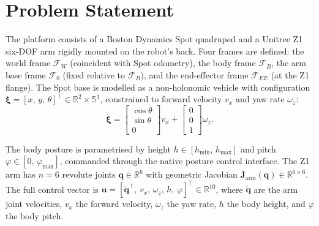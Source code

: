 \section{Problem Statement}
\label{sec:problem_formulation}

The  platform consists of a Boston Dynamics Spot quadruped and a
Unitree Z1 six-\ac{DOF} arm rigidly mounted on the robot's back. Four frames
are defined: the world frame $\mathcal{F}_W$ (coincident with Spot odometry),
the body frame $\mathcal{F}_B$, the arm base frame $\mathcal{F}_0$ (fixed
relative to $\mathcal{F}_B$), and the end-effector frame $\mathcal{F}_{EE}$ (at
the Z1 flange).  The Spot base is
modelled as a non-holonomic vehicle with
configuration $\boldsymbol{\xi} = [x,\, y,\, \theta]^\top \in \mathbb{R}^2
\times \mathbb{S}^1$, constrained to forward velocity $v_x$ and yaw rate
$\omega_z$:
\begin{equation}
\dot{\boldsymbol{\xi}} =
\begin{bmatrix} \cos\theta \\ \sin\theta \\ 0 \end{bmatrix} v_x
+
\begin{bmatrix} 0 \\ 0 \\ 1 \end{bmatrix} \omega_z.
\label{eq:nonholonomic}
\end{equation}

The body posture is parametrised by height $h \in [h_{\min},\, h_{\max}]$ and
pitch $\varphi \in [0,\, \varphi_{\max}]$, commanded through the native posture
control interface. The Z1 arm has $n = 6$ revolute joints
$\mathbf{q} \in \mathbb{R}^6$ with geometric Jacobian
$\mathbf{J}_{\mathrm{arm}}(\mathbf{q}) \in \mathbb{R}^{6 \times 6}$. The full
control vector is
$\mathbf{u} = [\dot{\mathbf{q}}^\top,\, v_x,\, \omega_z,\, h,\,
\varphi]^\top \in \mathbb{R}^{10}$, where $\dot{\mathbf{q}}$ are the arm joint
velocities, $v_x$ the forward velocity, $\omega_z$ the yaw rate, $h$ the body
height, and $\varphi$ the body pitch.

